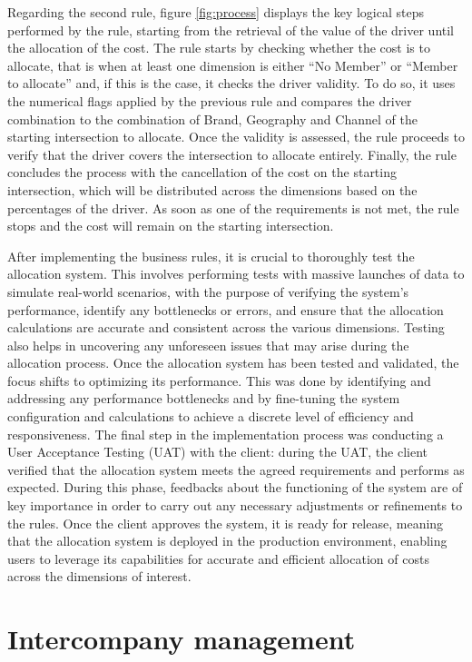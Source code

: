 \documentclass[12pt,a4paper,openright,twoside]{book}
\begin{document}
Regarding the second rule, figure \ref{fig:process} displays the key logical steps performed by the rule, starting from the retrieval of the value of the driver until the allocation of the cost.
%
The rule starts by checking whether the cost is to allocate, that is when at least one dimension is either ``No Member'' or ``Member to allocate'' and, if this is the case, it checks the driver validity.
%
To do so, it uses the numerical flags applied by the previous rule and compares the driver combination to the combination of Brand, Geography and Channel of the starting intersection to allocate.
%
Once the validity is assessed, the rule proceeds to verify that the driver covers the intersection to allocate entirely.
%
Finally, the rule concludes the process with the cancellation of the cost on the starting intersection, which will be distributed across the dimensions based on the percentages of the driver.
%
As soon as one of the requirements is not met, the rule stops and the cost will remain on the starting intersection.

After implementing the business rules, it is crucial to thoroughly test the allocation system.
%
This involves performing tests with massive launches of data to simulate real-world scenarios, with the purpose of verifying the system's performance, identify any bottlenecks or errors, and ensure that the allocation calculations are accurate and consistent across the various dimensions. 
%
Testing also helps in uncovering any unforeseen issues that may arise during the allocation process.
%
Once the allocation system has been tested and validated, the focus shifts to optimizing its performance. 
%
This was done by identifying and addressing any performance bottlenecks and by fine-tuning the system configuration and calculations to achieve a discrete level of efficiency and responsiveness. 
%
The final step in the implementation process was conducting a User Acceptance Testing (UAT) with the client: during the UAT, the client verified that the allocation system meets the agreed requirements and performs as expected. 
%
During this phase, feedbacks about the functioning of the system are of key importance in order to carry out any necessary adjustments or refinements to the rules.
%
Once the client approves the system, it is ready for release, meaning that the allocation system is deployed in the production environment, enabling users to leverage its capabilities for accurate and efficient allocation of costs across the dimensions of interest.

\section{Intercompany management}
\end{document}
